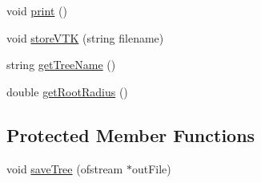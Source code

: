 \begin{DoxyCompactItemize}
\item 
void \hyperlink{class_f_r_r_variable_viscosity_c_c_o_s_tree_aec99594cf57192d80753147314483bc8}{print} ()
\item 
void \hyperlink{class_f_r_r_variable_viscosity_c_c_o_s_tree_abaa13c9055261bef97b112898e6106a2}{store\+V\+TK} (string filename)
\item 
string \hyperlink{class_f_r_r_variable_viscosity_c_c_o_s_tree_aac408960939d867d0a2014f4ced90d4d}{get\+Tree\+Name} ()
\item 
double \hyperlink{class_f_r_r_variable_viscosity_c_c_o_s_tree_a13cac292b851708de4900320582b4b14}{get\+Root\+Radius} ()
\end{DoxyCompactItemize}
\subsection*{Protected Member Functions}
\begin{DoxyCompactItemize}
\item 
void \hyperlink{class_f_r_r_variable_viscosity_c_c_o_s_tree_a545594bd2399bce109673929a46353ae}{save\+Tree} (ofstream $\ast$out\+File)
\end{DoxyCompactItemize}
